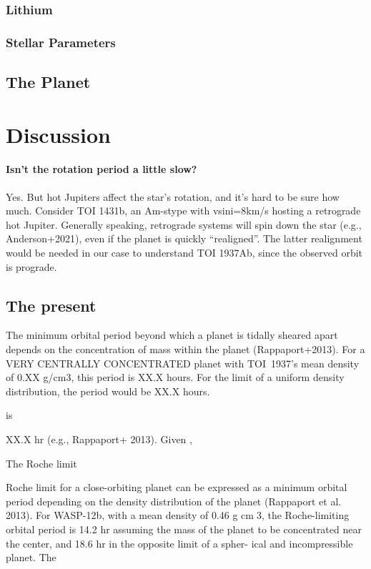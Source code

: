 \documentclass[12pt,twocolumn,tighten]{aastex63}
\newcommand{\tn}{TOI~1937} %
\begin{document}
\subsubsection{Lithium}

\subsubsection{Stellar Parameters}
\label{subsec:starparams}

\subsection{The Planet}
\label{subsec:planet}


\section{Discussion}
\label{sec:discussion}

\paragraph{Isn't the rotation period a little slow?}
Yes. But hot Jupiters affect the star's rotation, and it's hard to be
sure how much. Consider TOI 1431b, an Am-stype with vsini=8km/s
hosting a retrograde hot Jupiter. 
Generally speaking, retrograde systems will spin down the star (e.g.,
Anderson+2021), even if the planet is quickly ``realigned''.
The latter realignment would be needed in our case to understand TOI
1937Ab, since the observed orbit is prograde.

\subsection{The present}

The minimum orbital period beyond which a planet is tidally sheared
apart depends on the concentration of mass within the planet
(Rappaport+2013).
For a VERY CENTRALLY CONCENTRATED planet with \tn's
mean density of 0.XX g/cm3, this period is XX.X hours.
For the limit of a uniform density distribution, the period would be
XX.X hours.

is 

XX.X hr (e.g., Rappaport+ 2013).
Given ,


The Roche limit 

Roche limit for a close-orbiting planet can
be expressed as a minimum orbital period depending
on the density distribution of the planet (Rappaport
et al. 2013). For WASP-12b, with a mean density of
0.46 g cm􀀀3, the Roche-limiting orbital period is 14.2 hr
assuming the mass of the planet to be concentrated near
the center, and 18.6 hr in the opposite limit of a spher-
ical and incompressible planet. The
\end{document}
